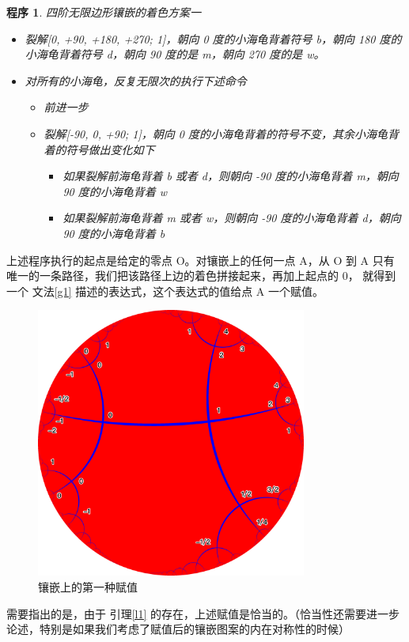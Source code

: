 \documentclass[a4paper,12pt]{article}
\newtheorem{program}{程序}
\begin{document}
\begin{program}
四阶无限边形镶嵌的着色方案一
\begin{itemize}
\item 裂解[0, +90, +180, +270; 1]，朝向 0 度的小海龟背着符号 b，朝向 180 度的小海龟背着符号 d，朝向 90 度的是 m，朝向 270 度的是 w。
\item 对所有的小海龟，反复无限次的执行下述命令
\begin{itemize}
  \item 前进一步
  \item 裂解[-90, 0, +90; 1]，朝向 0 度的小海龟背着的符号不变，其余小海龟背着的符号做出变化如下
    \begin{itemize}
      \item 如果裂解前海龟背着 b 或者 d，则朝向 -90 度的小海龟背着 m，朝向 90 度的小海龟背着 w
      \item 如果裂解前海龟背着 m 或者 w，则朝向 -90 度的小海龟背着 d，朝向 90 度的小海龟背着 b
    \end{itemize}
  \end{itemize}
\end{itemize}
\end{program}

上述程序执行的起点是给定的零点 O。对镶嵌上的任何一点 A，从 O 到 A 只有唯一的一条路径，我们把该路径上边的着色拼接起来，再加上起点的 0，
就得到一个 文法\ref{g1} 描述的表达式，这个表达式的值给点 A 一个赋值。

\begin{figure}[ht]
\centering
\includegraphics[width=3.5in]{images/H2_tiling_with_assign_1.png}
\caption{镶嵌上的第一种赋值}
\end{figure}

需要指出的是，由于 引理\ref{l1} 的存在，上述赋值是恰当的。（恰当性还需要进一步论述，特别是如果我们考虑了赋值后的镶嵌图案的内在对称性的时候）
\end{document}
